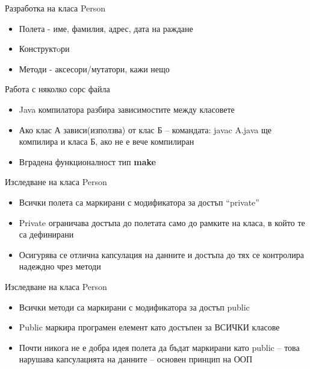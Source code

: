 \documentclass{beamer}
\begin{document}
\begin{frame}{Разработка на класа Person}
  \transdissolve
  \begin{itemize}
  \item Полета - име, фамилия, адрес, дата на раждане
  \item Конструктoри
  \item Методи - аксесори/мутатори, кажи нещо
  \end{itemize}
\end{frame}

\begin{frame}{Работа с няколко сорс файла}
  \transdissolve
  \begin{itemize}
  \item   Java компилатора разбира
    зависимостите между класовете
  \item  Ако клас А зависи(използва) от клас Б –
    командата:
    javac A.java
    ще компилира и класа Б, ако не е вече
    компилиран
   \item  Вградена функционалност тип \textbf{make}
  \end{itemize}
\end{frame}

\begin{frame}{Изследване на класа Person}
  \transdissolve
  \begin{itemize}
  \item    Всички полета са маркирани с
    модификатора за достъп “private”

   \item Private ограничава достъпа до полетата
    само до рамките на класа, в който те са
    дефинирани

   \item Осигурява се отлична капсулация на
    данните и достъпа до тях се контролира
    надеждно чрез методи

  \end{itemize}
\end{frame}

\begin{frame}{Изследване на класа Person}
  \transdissolve
  \begin{itemize}
  \item   Всички методи са маркирани с
    модификатора за достъп public
  \item  Public маркира програмен елемент като
    достъпен за ВСИЧКИ класове

  \item  Почти никога не е добра идея полета да
    бъдат маркирани като public – това
    нарушава капсулацията на данните –
    основен принцип на ООП
  \end{itemize}
\end{frame}
\end{document}
